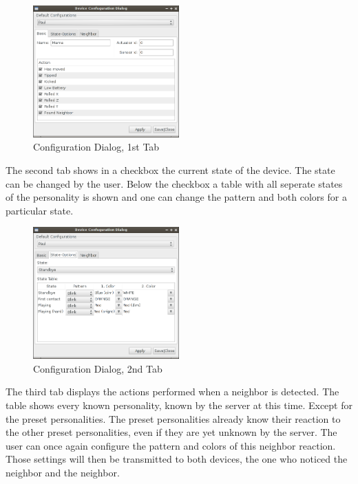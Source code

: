 \begin{figure}[h!]
 \centering
 \includegraphics[width= 0.5\textwidth, clip=true  ,keepaspectratio=true]{./pic/java-server-config01.png}
 \caption{Configuration Dialog, 1st Tab}
 \label{fig:java-server-config01}
\end{figure}

The second tab shows in a checkbox the current state of the device. The state can be changed by the user. Below the checkbox a table with all seperate states of the personality is shown and one can change the pattern and both colors for a particular state. 


\begin{figure}[h!]
 \centering
 \includegraphics[width= 0.5\textwidth, clip=true  ,keepaspectratio=true]{./pic/java-server-config02.png}
 \caption{Configuration Dialog, 2nd Tab}
 \label{fig:java-server-config02}
\end{figure}


The third tab displays the actions performed when a neighbor is detected. The table shows every known personality, known by the server at this time. Except for the preset personalities. The preset personalities already know their reaction to the other preset personalities, even if they are yet unknown by the server.
The user can once again configure the pattern and colors of this neighbor reaction. Those settings will then be transmitted to both devices, the one who noticed the neighbor and the neighbor.

